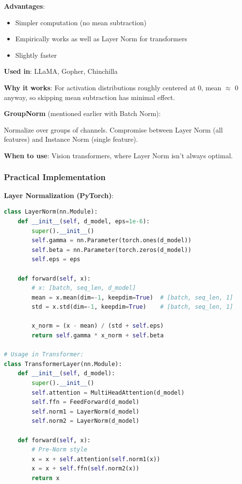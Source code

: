 \documentclass[11pt,oneside]{book}
\begin{document}
\textbf{Advantages}:
\begin{itemize}
\item Simpler computation (no mean subtraction)
\item Empirically works as well as Layer Norm for transformers
\item Slightly faster
\end{itemize}

\textbf{Used in}: LLaMA, Gopher, Chinchilla

\textbf{Why it works}: For activation distributions roughly centered at 0, mean $\approx$ 0 anyway, so skipping mean subtraction has minimal effect.

\textbf{GroupNorm} (mentioned earlier with Batch Norm):

Normalize over groups of channels. Compromise between Layer Norm (all features) and Instance Norm (single feature).

\textbf{When to use}: Vision transformers, where Layer Norm isn't always optimal.

\subsubsection{Practical Implementation}

\textbf{Layer Normalization (PyTorch)}:
\begin{lstlisting}[language=Python]
class LayerNorm(nn.Module):
    def __init__(self, d_model, eps=1e-6):
        super().__init__()
        self.gamma = nn.Parameter(torch.ones(d_model))
        self.beta = nn.Parameter(torch.zeros(d_model))
        self.eps = eps

    def forward(self, x):
        # x: [batch, seq_len, d_model]
        mean = x.mean(dim=-1, keepdim=True)  # [batch, seq_len, 1]
        std = x.std(dim=-1, keepdim=True)    # [batch, seq_len, 1]

        x_norm = (x - mean) / (std + self.eps)
        return self.gamma * x_norm + self.beta

# Usage in Transformer:
class TransformerLayer(nn.Module):
    def __init__(self, d_model):
        super().__init__()
        self.attention = MultiHeadAttention(d_model)
        self.ffn = FeedForward(d_model)
        self.norm1 = LayerNorm(d_model)
        self.norm2 = LayerNorm(d_model)

    def forward(self, x):
        # Pre-Norm style
        x = x + self.attention(self.norm1(x))
        x = x + self.ffn(self.norm2(x))
        return x
\end{lstlisting}
\end{document}
